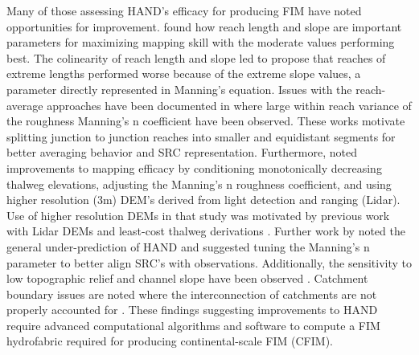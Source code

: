 Many of those assessing HAND's efficacy for producing FIM have noted opportunities for improvement. 
 found how reach length and slope are important parameters for maximizing mapping skill with the moderate values performing best. 
The colinearity of reach length and slope led  to propose that reaches of extreme lengths performed worse because of the extreme slope values, a parameter directly represented in Manning's equation. 
Issues with the reach-average approaches have been documented in  where large within reach variance of the roughness Manning's n coefficient have been observed.
These works motivate splitting junction to junction reaches into smaller and equidistant segments for better averaging behavior and SRC representation. 
Furthermore,  noted improvements to mapping efficacy by conditioning monotonically decreasing thalweg elevations, adjusting the Manning's n roughness coefficient, and using higher resolution (3m) DEM's derived from light detection and ranging (Lidar).
Use of higher resolution DEMs in that study was motivated by previous work with Lidar DEMs and least-cost thalweg derivations \cite{zheng2018geoflood}.
Further work by  noted the general under-prediction of HAND and suggested tuning the Manning's n parameter to better align SRC's with observations. 
Additionally, the sensitivity to low topographic relief and channel slope have been observed \cite{johnson2019integrated,godbout2019error}. 
Catchment boundary issues are noted where the interconnection of catchments are not properly accounted for \cite{zhang2018comparative,mcgehee2016modified}.
These findings suggesting improvements to HAND require advanced computational algorithms and software to compute a FIM hydrofabric required for producing continental-scale FIM (CFIM).


